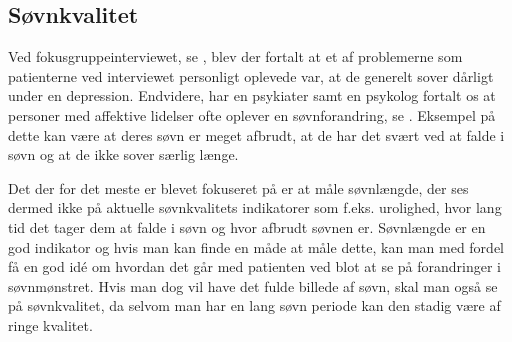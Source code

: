 \subsection{Søvnkvalitet}
Ved fokusgruppeinterviewet, se \citep[Kapitel 1, Sektion 5]{misc:faellesrapp}, blev der fortalt at et af problemerne som patienterne ved interviewet personligt oplevede var, at de generelt sover dårligt under en depression.
Endvidere, har en psykiater samt en psykolog fortalt os at personer med affektive lidelser ofte oplever en søvnforandring, se \citep[Kapitel 1, Sektion 3 og 4]{misc:faellesrapp}.
Eksempel på dette kan være at deres søvn er meget afbrudt, at de har det svært ved at falde i søvn og at de ikke sover særlig længe.

Det der for det meste er blevet fokuseret på er at måle søvnlængde, der ses dermed ikke på aktuelle søvnkvalitets indikatorer som f.eks. urolighed, hvor lang tid det tager dem at falde i søvn og hvor afbrudt søvnen er.
Søvnlængde er en god indikator og hvis man kan finde en måde at måle dette, kan man med fordel få en god idé om hvordan det går med patienten ved blot at se på forandringer i søvnmønstret. 
Hvis man dog vil have det fulde billede af søvn, skal man også se på søvnkvalitet, da selvom man har en lang søvn periode kan den stadig være af ringe kvalitet.